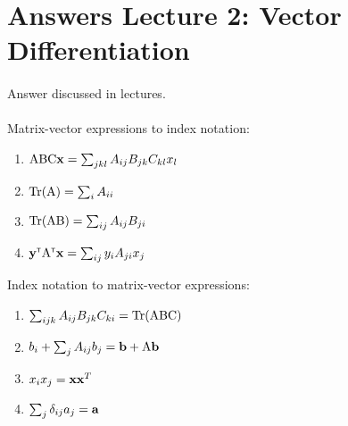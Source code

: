 \section{Answers Lecture 2: Vector Differentiation}
\paragraph{} Answer discussed in lectures.

\paragraph{}

Matrix-vector expressions to index notation: 
\begin{enumerate}[label=\alph*.]
\item ${\mathrm{{A}}} {\mathrm{{B}}} {\mathrm{{C}}} \mathbf{x} = \sum_{jkl} A_{ij} B_{jk} C_{kl} x_l$
\item $\operatorname{Tr}({\mathrm{{A}}}) = \sum_i A_{ii}$
\item $\operatorname{Tr}({\mathrm{{A}}} {\mathrm{{B}}}) = \sum_{ij} A_{ij} B_{ji}$
\item $\mathbf{y}^\mathrm{\textsf{\tiny T}} {\mathrm{{A}}}^\mathrm{\textsf{\tiny T}} \mathbf{x} = \sum_{ij} y_i A_{ji} x_j$
\end{enumerate}
Index notation to matrix-vector expressions:
\begin{enumerate}[label=\alph*.]
\item $\sum_{ijk} A_{ij}B_{jk}C_{ki} = \operatorname{Tr}({\mathrm{{A}}} {\mathrm{{B}}} {\mathrm{{C}}})$
\item $b_i + \sum_j A_{ij}b_j = \mathbf{b} + {\mathrm{{A}}} \mathbf{b}$
\item $x_ix_j = \mathbf{x} \mathbf{x}^T$
\item $\sum_j \delta_{ij}a_j = \mathbf{a}$
\end{enumerate}

